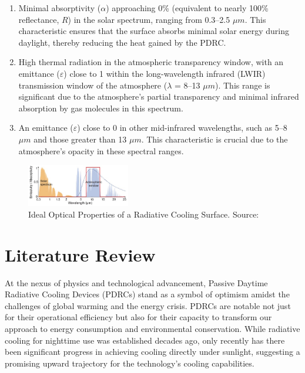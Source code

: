 \begin{enumerate} 
\item Minimal absorptivity ($\alpha$) approaching 0\% (equivalent to nearly 100\% reflectance, $R$) in the solar spectrum, ranging from 0.3–2.5 $\mu m$. This characteristic ensures that the surface absorbs minimal solar energy during daylight, thereby reducing the heat gained by the PDRC.
\item High thermal radiation in the atmospheric transparency window, with an emittance ($\varepsilon$) close to 1 within the long-wavelength infrared (LWIR) transmission window of the atmosphere ($\lambda$ = 8–13 $\mu m$). This range is significant due to the atmosphere's partial transparency and minimal infrared absorption by gas molecules in this spectrum.
\item An emittance ($\varepsilon$) close to 0 in other mid-infrared wavelengths, such as 5–8 $\mu m$ and those greater than 13 $\mu m$. This characteristic is crucial due to the atmosphere's opacity in these spectral ranges.
\end{enumerate}

\begin{figure}[ht!]
  \centering
  \includegraphics[width=0.4\textwidth]{Chapters/Figures/Ideal Optical Properties of a Radiative Cooling Surface.jpg}
  \caption[Ideal Optical Properties of a Radiative Cooling Surface]{Ideal Optical Properties of a Radiative Cooling Surface. Source: \cite{yang_passive_2020}}
  \label{fig:ideal_PDRC_properties}
\end{figure}



\section{Literature Review}
At the nexus of physics and technological advancement, Passive Daytime Radiative Cooling Devices (PDRCs) stand as a symbol of optimism amidst the challenges of global warming and the energy crisis. PDRCs are notable not just for their operational efficiency but also for their capacity to transform our approach to energy consumption and environmental conservation. While radiative cooling for nighttime use was established decades ago, only recently has there been significant progress in achieving cooling directly under sunlight, suggesting a promising upward trajectory for the technology's cooling capabilities.

